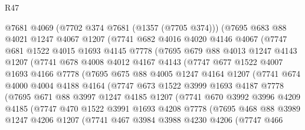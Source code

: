 \begin{lexlean}{R47}
\begin{coremodule}
      @7681
      @4069
      (@7702 @374 @7681 (@1357 (@7705 @374)))
      (@7695
        @683
        @88
        @4021
        @1247
        @4067
        @1207
        (@7741
          @682
          @4016
          @4020
          @4146
          @4067
          (@7747
            @681
            @1522
            @4015
            @1693
            @4145
            @7778
            (@7695
              @679
              @88
              @4013
              @1247
              @4143
              @1207
              (@7741
                @678
                @4008
                @4012
                @4167
                @4143
                (@7747
                  @677
                  @1522
                  @4007
                  @1693
                  @4166
                  @7778
                  (@7695
                    @675
                    @88
                    @4005
                    @1247
                    @4164
                    @1207
                    (@7741
                      @674
                      @4000
                      @4004
                      @4188
                      @4164
                      (@7747
                        @673
                        @1522
                        @3999
                        @1693
                        @4187
                        @7778
                        (@7695
                          @671
                          @88
                          @3997
                          @1247
                          @4185
                          @1207
                          (@7741
                            @670
                            @3992
                            @3996
                            @4209
                            @4185
                            (@7747
                              @470
                              @1522
                              @3991
                              @1693
                              @4208
                              @7778
                              (@7695
                                @468
                                @88
                                @3989
                                @1247
                                @4206
                                @1207
                                (@7741
                                  @467
                                  @3984
                                  @3988
                                  @4230
                                  @4206
                                  (@7747
                                    @466

\end{coremodule}
\end{lexlean}
